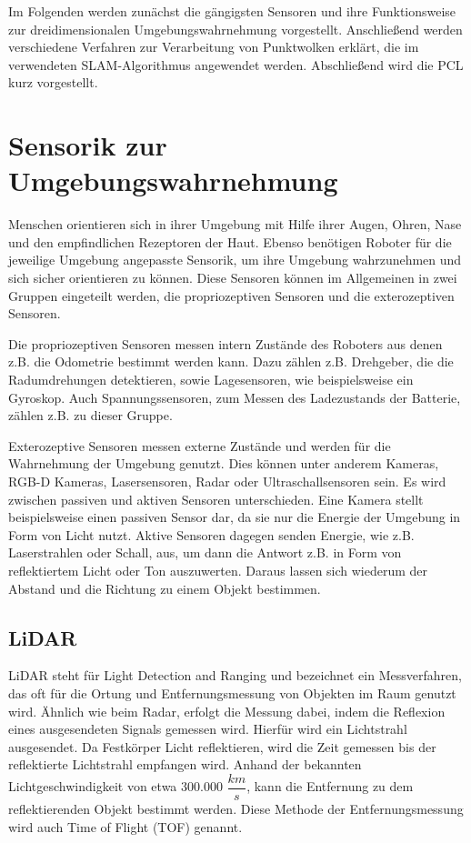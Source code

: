 Im Folgenden werden zunächst die gängigsten Sensoren und ihre Funktionsweise zur dreidimensionalen Umgebungswahrnehmung vorgestellt. Anschließend werden verschiedene Verfahren zur Verarbeitung von Punktwolken erklärt, die im ver\-wen\-det\-en SLAM-Algorithmus angewendet werden. Abschließend wird die PCL kurz vor\-ge\-stellt.

\section[Sensorik zur Umgebungswahrnehmung (Kopp)]{Sensorik zur Umgebungswahrnehmung}

Menschen orientieren sich in ihrer Umgebung mit Hilfe ihrer Augen, Ohren, Nase und den empfindlichen Rezeptoren der Haut. Ebenso benötigen Roboter für die jeweilige Umgebung angepasste Sensorik, um ihre Umgebung wahrzunehmen und sich sicher orientieren zu können. Diese Sensoren können im Allgemeinen in zwei Gruppen eingeteilt werden, die propriozeptiven Sensoren und die exterozeptiven Sensoren.

Die propriozeptiven Sensoren messen intern Zustände des Roboters aus denen z.B. die Odometrie bestimmt werden kann. Dazu zählen z.B. Drehgeber, die die Rad\-um\-dreh\-ung\-en detektieren, sowie Lagesensoren, wie beispielsweise ein Gyroskop. Auch Spannungssensoren, zum Messen des Ladezustands der Batterie, zählen z.B. zu dieser Gruppe.

Exterozeptive Sensoren messen externe Zustände und werden für die Wahr\-nehm\-ung der Umgebung genutzt. Dies können unter anderem Kameras, RGB-D Kameras, La\-ser\-sen\-sor\-en, Radar oder Ultraschallsensoren sein. Es wird zwischen passiven und aktiven Sensoren unterschieden. Eine Kamera stellt beispielsweise einen passiven Sensor dar, da sie nur die Energie der Umgebung in Form von Licht nutzt. Aktive Sensoren dagegen senden Energie, wie z.B. Laserstrahlen oder Schall, aus, um dann die Antwort z.B. in Form von reflektiertem Licht oder Ton auszuwerten. Daraus lassen sich wiederum der Abstand und die Richtung zu einem Objekt bestimmen.

\subsection[LiDAR (Kopp)]{LiDAR}

LiDAR steht für Light Detection and Ranging und bezeichnet ein Messverfahren, das oft für die Ortung und Entfernungsmessung von Objekten im Raum genutzt wird. Ähnlich wie beim Radar, erfolgt die Messung dabei, indem die Reflexion eines ausgesendeten Signals gemessen wird. Hierfür wird ein Lichtstrahl ausgesendet. Da Festkörper Licht reflektieren, wird die Zeit gemessen bis der reflektierte Lichtstrahl empfangen wird. Anhand der bekannten Lichtgeschwindigkeit von etwa 300.000 $ \dfrac{km}{s} $, kann die Entfernung zu dem reflektierenden Objekt bestimmt werden. Diese Methode der Entfernungsmessung wird auch Time of Flight (TOF) genannt.

